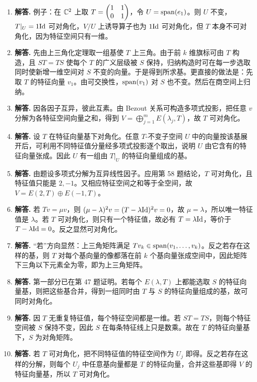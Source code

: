 \begin{enumerate}[label=\textbf{\arabic*.}, leftmargin=*, itemsep=1em]
\item \textbf{解答.} 例子：在 $\mathbb{C}^2$ 上取 $T=\begin{pmatrix} 1&1\\0&1 \end{pmatrix}$，令 $U=\operatorname{span}(e_1)$。则 $U$ 不变，$T|_U=1\mathrm{Id}$ 可对角化，$V/U$ 上诱导算子也为 $1\mathrm{Id}$ 可对角化，但 $T$ 本身不可对角化，因为特征空间只有一维。
\item \textbf{解答.} 先由上三角化定理取一组基使 $T$ 上三角。由于前 $k$ 维旗标可由 $T$ 构造，且 $ST=TS$ 使每个 $T$ 的广义层级被 $S$ 保持，归纳构造时可在每一步选取同时使新增一维空间对 $S$ 不变的向量。于是得到所求基。更直接的做法是：先取 $T$ 的特征向量 $v_1$。由可交换性，$\operatorname{span}(v_1)$ 对 $S$ 也不变。然后在商空间上归纳。
\item \textbf{解答.} 因各因子互异，彼此互素。由 Bezout 关系可构造多项式投影，把任意 $v$ 分解为各特征空间向量之和，得到
$V=\bigoplus_{j=1}^mE(\lambda_j,T)$，故 $T$ 可对角化。
\item \textbf{解答.} 设 $T$ 在特征向量基下对角化。任意 $T$-不变子空间 $U$ 中的向量按该基展开后，可利用不同特征值分量经多项式投影逐个取出，说明 $U$ 由它含有的特征向量张成。因此 $U$ 有一组由 $T|_U$ 的特征向量组成的基。
\item \textbf{解答.} 由题设多项式分解为互异线性因子。应用第 58 题结论，$T$ 可对角化，且特征值只能是 $2,-1$。又相应特征空间之和等于全空间，故 $V=E(2,T)\oplus E(-1,T)$。
\item \textbf{解答.} 若 $Tv=\mu v$，则 $(\mu-\lambda)^2v=(T-\lambda\mathrm{Id})^2v=0$，故 $\mu=\lambda$，所以唯一特征值是 $\lambda$。若 $T$ 可对角化，则只有一个特征值，故必有 $T=\lambda\mathrm{Id}$，等价于 $T-\lambda\mathrm{Id}=0$。反之显然可对角化。
\item \textbf{解答.} “若”方向显然：上三角矩阵满足 $Tv_k\in\operatorname{span}(v_1,\dots,v_k)$。反之若存在这样的基，则 $T$ 对每个基向量的像都落在前 $k$ 个基向量张成空间中，因此矩阵下三角以下元素全为零，即为上三角矩阵。
\item \textbf{解答.} 第一部分已在第 47 题证明。若每个 $E(\lambda,T)$ 上都能选取 $S$ 的特征向量基，则把这些基合并，得到一组同时由 $T$ 与 $S$ 的特征向量组成的基，故可同时对角化。
\item \textbf{解答.} 因 $T$ 无重复特征值，每个特征空间都是一维。若 $ST=TS$，则每个特征空间被 $S$ 保持不变，因此 $S$ 在每条特征线上只是数乘。故在 $T$ 的特征向量基下，$S$ 为对角矩阵。
\item \textbf{解答.} 若 $T$ 可对角化，把不同特征值的特征空间作为 $U_j$ 即得。反之若存在这样的分解，则每个 $U_j$ 中任意基向量都是 $T$ 的特征向量，合并这些基即得 $V$ 的特征向量基，所以 $T$ 可对角化。
\end{enumerate}

